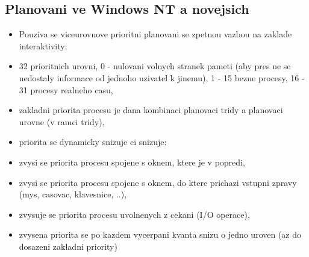 \documentclass[a4paper, 11pt]{article}
\begin{document}
\subsection{Planovani ve Windows NT a novejsich}
\begin{itemize}
    \item Pouziva se viceurovnove prioritni planovani se zpetnou vazbou na zaklade interaktivity:
    \item 32 prioritnich urovni, 0 - nulovani volnych stranek pameti (aby pres ne se nedostaly informace od jednoho uzivatel k jinemu), 1 - 15 bezne procesy, 16 - 31 procesy realneho casu,
    \item zakladni priorita procesu je dana kombinaci planovaci tridy a planovaci urovne (v ramci tridy),
    \item priorita se dynamicky snizuje ci snizuje:
    \item zvysi se priorita procesu spojene s oknem, ktere je v popredi,
    \item zvysi se priorita procesu spojene s oknem, do ktere prichazi vstupni zpravy (mys, casovac, klavesnice, ..),
    \item zvysuje se priorita procesu uvolnenych z cekani (I/O operace),
    \item zvysena priorita se po kazdem vycerpani kvanta snizu o jedno uroven (az do dosazeni zakladni priority) \\
\end{itemize}
\end{document}
